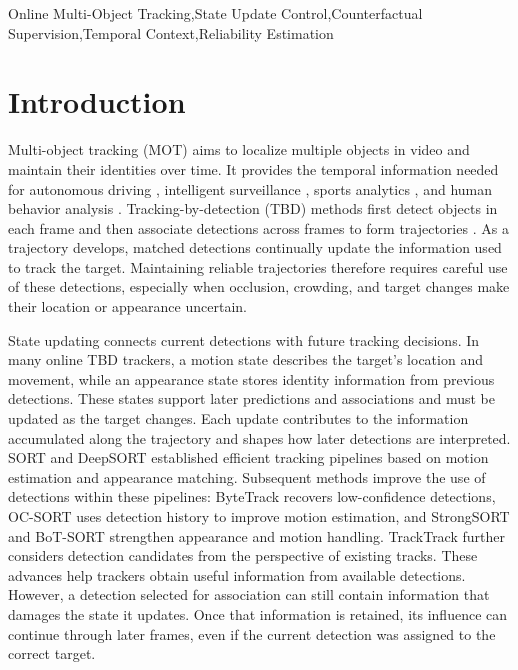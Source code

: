 \documentclass[a4paper,fleqn]{cas-sc}
\begin{document}
\begin{keywords}
Online Multi-Object Tracking\sep State Update Control\sep Counterfactual Supervision\sep Temporal Context\sep Reliability Estimation
\end{keywords}

\maketitle

\section{Introduction}

Multi-object tracking (MOT) aims to localize multiple objects in video and maintain their identities over time. It provides the temporal information needed for autonomous driving \cite{geiger2012we}, intelligent surveillance \cite{yin2019large}, sports analytics \cite{cui2023sportsmot}, and human behavior analysis \cite{kong2022human}. Tracking-by-detection (TBD) methods first detect objects in each frame and then associate detections across frames to form trajectories \cite{bewley2016simple,wojke2017simple,zhang2022bytetrack}. As a trajectory develops, matched detections continually update the information used to track the target. Maintaining reliable trajectories therefore requires careful use of these detections, especially when occlusion, crowding, and target changes make their location or appearance uncertain.

State updating connects current detections with future tracking decisions. In many online TBD trackers, a motion state describes the target's location and movement, while an appearance state stores identity information from previous detections. These states support later predictions and associations and must be updated as the target changes. Each update contributes to the information accumulated along the trajectory and shapes how later detections are interpreted. SORT \cite{bewley2016simple} and DeepSORT \cite{wojke2017simple} established efficient tracking pipelines based on motion estimation and appearance matching. Subsequent methods improve the use of detections within these pipelines: ByteTrack \cite{zhang2022bytetrack} recovers low-confidence detections, OC-SORT \cite{cao2023observation} uses detection history to improve motion estimation, and StrongSORT \cite{du2023strongsort} and BoT-SORT \cite{aharon2022bot} strengthen appearance and motion handling. TrackTrack \cite{shim2025focusing} further considers detection candidates from the perspective of existing tracks. These advances help trackers obtain useful information from available detections. However, a detection selected for association can still contain information that damages the state it updates. Once that information is retained, its influence can continue through later frames, even if the current detection was assigned to the correct target.
\end{document}

